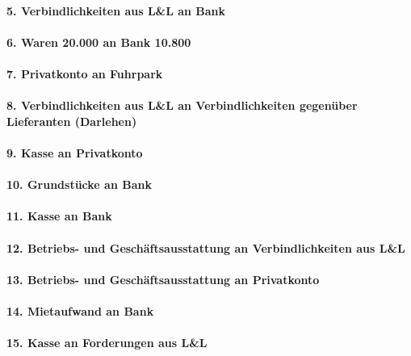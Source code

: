 \documentclass[paper=a4, fontsize=11pt]{scrartcl}
\numberwithin{equation}{section}
\numberwithin{figure}{section}
\numberwithin{table}{section}
\begin{document}
\paragraph{5. Verbindlichkeiten aus L&L an Bank}

\paragraph{6. Waren 20.000 an Bank 10.800}

\paragraph{7. Privatkonto an Fuhrpark}

\paragraph{8. Verbindlichkeiten aus L&L an Verbindlichkeiten gegenüber Lieferanten (Darlehen)}

\paragraph{9. Kasse an Privatkonto}

\paragraph{10. Grundstücke an Bank}

\paragraph{11. Kasse an Bank}

\paragraph{12. Betriebs- und Geschäftsausstattung an Verbindlichkeiten aus L&L}

\paragraph{13. Betriebs- und Geschäftsausstattung an Privatkonto}

\paragraph{14. Mietaufwand an Bank}

\paragraph{15. Kasse an Forderungen aus L&L}
\end{document}

